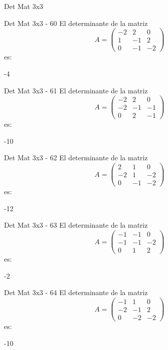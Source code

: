 \documentclass[a4,11pt]{aleph-notas}
\begin{document}
\begin{quiz}{Det Mat 3x3}
\begin{numerical}[tolerance=0]%
    {Det Mat 3x3 - 60}
    El determinante de la matriz
    \[
        A = \begin{pmatrix} -2 & 2 & 0 \\ 1 & -1 & 2 \\ 0 & -1 & -2 \end{pmatrix}
    \]
    es:
    \item[] -4
\end{numerical}

\begin{numerical}[tolerance=0]%
    {Det Mat 3x3 - 61}
    El determinante de la matriz
    \[
        A = \begin{pmatrix} -2 & 2 & 0 \\ -2 & -1 & -1 \\ 0 & 2 & -1 \end{pmatrix}
    \]
    es:
    \item[] -10
\end{numerical}

\begin{numerical}[tolerance=0]%
    {Det Mat 3x3 - 62}
    El determinante de la matriz
    \[
        A = \begin{pmatrix} 2 & 1 & 0 \\ -2 & 1 & -2 \\ 0 & -1 & -2 \end{pmatrix}
    \]
    es:
    \item[] -12
\end{numerical}

\begin{numerical}[tolerance=0]%
    {Det Mat 3x3 - 63}
    El determinante de la matriz
    \[
        A = \begin{pmatrix} -1 & -1 & 0 \\ -1 & -1 & -2 \\ 0 & 1 & 2 \end{pmatrix}
    \]
    es:
    \item[] -2
\end{numerical}

\begin{numerical}[tolerance=0]%
    {Det Mat 3x3 - 64}
    El determinante de la matriz
    \[
        A = \begin{pmatrix} -1 & 1 & 0 \\ -2 & -1 & 2 \\ 0 & -2 & -2 \end{pmatrix}
    \]
    es:
    \item[] -10
\end{numerical}


\end{quiz}
\end{document}
